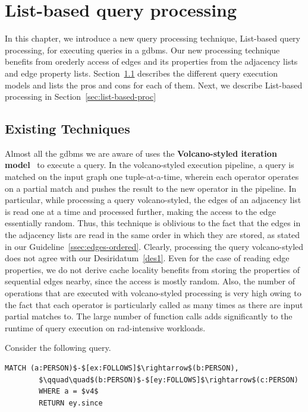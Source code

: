 \chapter{List-based query processing}
\label{list-based-processing}

In this chapter, we introduce a new query processing technique, List-based query processing, for executing queries in a \gls{gdbms}. Our new processing technique benefits from orederly access of edges and its properties from the adjacency lists and edge property lists. Section~\ref{sec:existing-techniques} describes the different query execution models and lists the pros and cons for each of them. Next, we describe List-based processing in Section~\ref{sec:list-based-proc}

\section{Existing Techniques}
\label{sec:existing-techniques}
Almost all the \gls{gdbms} we are aware of uses the \textbf{Volcano-styled iteration model}~\cite{volcano} to execute a query. In the volcano-styled execution pipeline, a query is matched on the input graph one tuple-at-a-time, wherein each operator operates on a partial match and pushes the result to the new operator in the pipeline. In particular, while processing a query volcano-styled, the edges of an adjacency list is read one at a time and processed further, making the access to the edge essentially random. Thus, this technique is oblivious to the fact that the edges in the adjacency lists are read in the same order in which they are stored, as stated in our Guideline~\ref{ssec:edges-ordered}. Clearly, processing the query volcano-styled does not agree with our Desiridatum~\ref{des1}. Even for the case of reading edge properties, we do not derive cache locality benefits from storing the properties of sequential edges nearby, since the access is mostly random. Also, the number of operations that are executed with volcano-styled processing is very high owing to the fact that each operator is particularly called as many times as there are input partial matches to. The large number of function calls adds significantly to the runtime of query execution on rad-intensive workloads.

\begin{example}
	\vspace{5pt}
	\label{ex:proc-example}
	Consider the following query. 
	{\em 
		\begin{lstlisting}[numbers=none,  showstringspaces=false,belowskip=0pt ]
		MATCH (a:PERSON)$-$[ex:FOLLOWS]$\rightarrow$(b:PERSON),
		$\qquad\quad$(b:PERSON)$-$[ey:FOLLOWS]$\rightarrow$(c:PERSON)
		WHERE a = $v4$
		RETURN ey.since\end{lstlisting}
	}
\end{example}
\vspace{-5pt}

